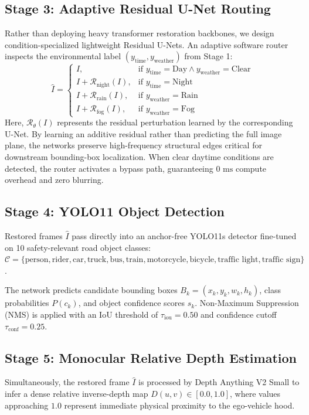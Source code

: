 \documentclass[conference]{IEEEtran}
\begin{document}
\subsection{Stage 3: Adaptive Residual U-Net Routing}
Rather than deploying heavy transformer restoration backbones, we design condition-specialized lightweight Residual U-Nets. An adaptive software router inspects the environmental label $(y_{\text{time}}, y_{\text{weather}})$ from Stage 1:
\begin{equation}
\hat{I} = 
\begin{cases}
I, & \text{if } y_{\text{time}}=\text{Day} \land y_{\text{weather}}=\text{Clear} \\
I + \mathcal{R}_{\text{night}}(I), & \text{if } y_{\text{time}}=\text{Night} \\
I + \mathcal{R}_{\text{rain}}(I), & \text{if } y_{\text{weather}}=\text{Rain} \\
I + \mathcal{R}_{\text{fog}}(I), & \text{if } y_{\text{weather}}=\text{Fog}
\end{cases}
\label{eq:router}
\end{equation}
Here, $\mathcal{R}_{\theta}(I)$ represents the residual perturbation learned by the corresponding U-Net. By learning an additive residual rather than predicting the full image plane, the networks preserve high-frequency structural edges critical for downstream bounding-box localization. When clear daytime conditions are detected, the router activates a bypass path, guaranteeing $0\text{ ms}$ compute overhead and zero blurring.

\subsection{Stage 4: YOLO11 Object Detection}
Restored frames $\hat{I}$ pass directly into an anchor-free YOLO11s detector fine-tuned on 10 safety-relevant road object classes: $\mathcal{C} = \{\text{person}, \text{rider}, \text{car}, \text{truck}, \text{bus}, \text{train}, \text{motorcycle}, \text{bicycle}, \text{traffic light}, \text{traffic sign}\}$.

The network predicts candidate bounding boxes $B_k = (x_k, y_k, w_k, h_k)$, class probabilities $P(c_k)$, and object confidence scores $s_k$. Non-Maximum Suppression (NMS) is applied with an IoU threshold of $\tau_{\text{iou}} = 0.50$ and confidence cutoff $\tau_{\text{conf}} = 0.25$.

\subsection{Stage 5: Monocular Relative Depth Estimation}
Simultaneously, the restored frame $\hat{I}$ is processed by Depth Anything V2 Small to infer a dense relative inverse-depth map $D(u, v) \in [0.0, 1.0]$, where values approaching $1.0$ represent immediate physical proximity to the ego-vehicle hood.
\end{document}
